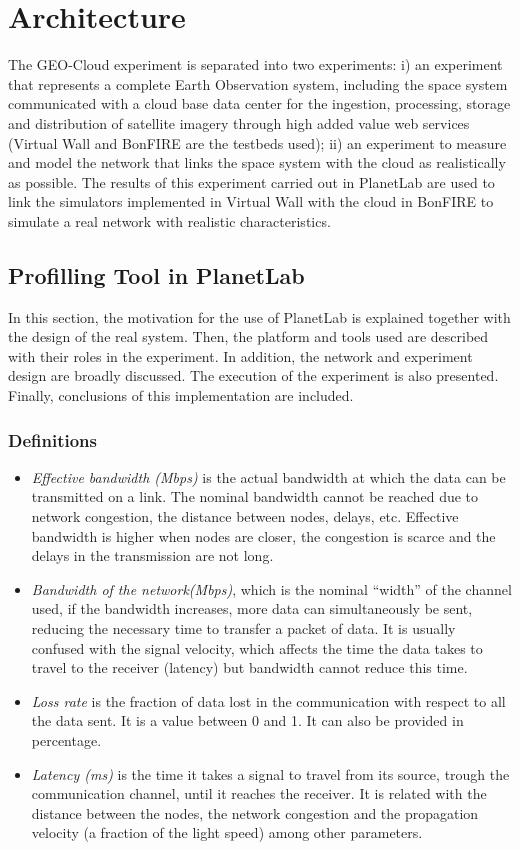 \chapter{Architecture}

The GEO-Cloud experiment is separated into two experiments: i) an experiment that represents a complete Earth Observation system, including the space system communicated with a cloud base data center for the ingestion, processing, storage and distribution of satellite imagery through high added value web services (Virtual Wall and BonFIRE are the testbeds used); ii) an experiment to measure and model the network that links the space system with the cloud as realistically as possible. The results of this experiment carried out in PlanetLab are used to link the simulators implemented in Virtual Wall with the cloud in BonFIRE to simulate a real network with realistic characteristics.

\section{Profilling Tool in PlanetLab}

In this section, the motivation for the use of PlanetLab is explained together
with the design of the real system. Then, the platform and tools used are
described with their roles in the experiment. In addition, the network and
experiment design are broadly discussed. The execution of the experiment is also
presented. Finally, conclusions of this implementation are included.


\subsection{Definitions}
\begin{itemize}
\item\emph{Effective bandwidth (Mbps)} is the actual bandwidth at which the data can be transmitted on a link. The nominal bandwidth cannot be reached due to network congestion, the distance between nodes, delays, etc. Effective bandwidth is higher when nodes are closer, the congestion is scarce and the delays in the transmission are not long.
\item\emph{Bandwidth of the network(Mbps)}, which is the nominal ``width'' of the channel used, if the bandwidth increases, more data can simultaneously be sent, reducing the necessary time to transfer a packet of data. It is usually confused with the signal velocity, which affects the time the data takes to travel to the receiver (latency) but bandwidth cannot reduce this time.
\item\emph{Loss rate} is the fraction of data lost in the communication with respect
to all the data sent. It is a value between 0 and 1. It can also be provided in
percentage.

\item\emph{Latency (ms)} is the time it takes a signal to travel from its source, trough the communication channel, until it reaches the receiver. It is related with the distance between the nodes, the network congestion and the propagation velocity (a fraction of the light speed) among other parameters. 
\end{itemize}


